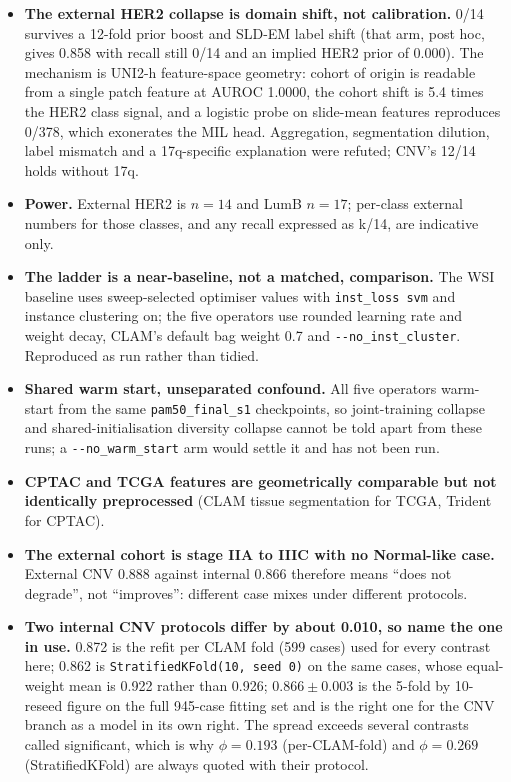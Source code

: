 \documentclass[10pt,a4paper]{article}
\begin{document}
\begin{itemize}
\setlength{\itemsep}{2pt}

\item \textbf{The external HER2 collapse is domain shift, not calibration.} 0/14 survives a
12-fold prior boost and SLD-EM label shift (that arm, post hoc, gives 0.858 with recall still 0/14
and an implied HER2 prior of 0.000). The mechanism is UNI2-h feature-space geometry: cohort of
origin is readable from a single patch feature at AUROC 1.0000, the cohort shift is 5.4 times the
HER2 class signal, and a logistic probe on slide-mean features reproduces 0/378, which exonerates
the MIL head. Aggregation, segmentation dilution, label mismatch and a 17q-specific explanation
were refuted; CNV's 12/14 holds without 17q.

\item \textbf{Power.} External HER2 is $n=14$ and LumB $n=17$; per-class external numbers for
those classes, and any recall expressed as k/14, are indicative only.

\item \textbf{The ladder is a near-baseline, not a matched, comparison.} The WSI baseline uses
sweep-selected optimiser values with \texttt{inst\_loss svm} and instance clustering on; the five
operators use rounded learning rate and weight decay, CLAM's default bag weight 0.7 and
\texttt{-{}-no\_inst\_cluster}. Reproduced as run rather than tidied.

\item \textbf{Shared warm start, unseparated confound.} All five operators warm-start from the
same \texttt{pam50\_final\_s1} checkpoints, so joint-training collapse and shared-initialisation
diversity collapse cannot be told apart from these runs; a \texttt{-{}-no\_warm\_start} arm would
settle it and has not been run.

\item \textbf{CPTAC and TCGA features are geometrically comparable but not identically
preprocessed} (CLAM tissue segmentation for TCGA, Trident for CPTAC).

\item \textbf{The external cohort is stage IIA to IIIC with no Normal-like case.} External CNV
0.888 against internal 0.866 therefore means ``does not degrade'', not ``improves'': different
case mixes under different protocols.

\item \textbf{Two internal CNV protocols differ by about 0.010, so name the one in use.} 0.872 is
the refit per CLAM fold (599 cases) used for every contrast here; 0.862 is
\texttt{StratifiedKFold(10, seed 0)} on the same cases, whose equal-weight mean is 0.922 rather
than 0.926; $0.866 \pm 0.003$ is the 5-fold by 10-reseed figure on the full 945-case fitting set
and is the right one for the CNV branch as a model in its own right. The spread exceeds several
contrasts called significant, which is why $\phi = 0.193$ (per-CLAM-fold) and $\phi = 0.269$
(StratifiedKFold) are always quoted with their protocol.


\end{itemize}
\end{document}
